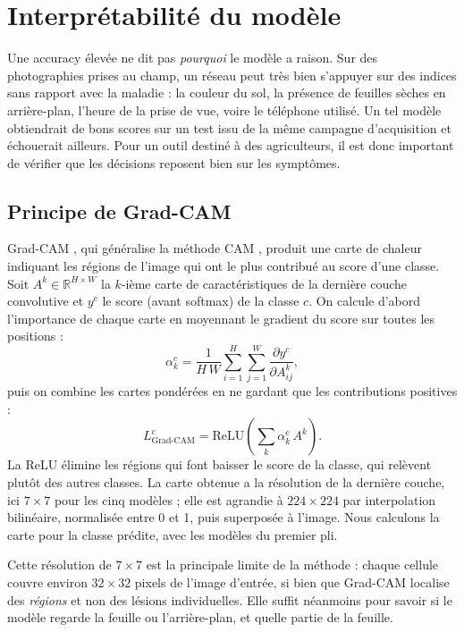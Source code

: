 \section{Interprétabilité du modèle}
\label{sec:interpretabilite}

Une accuracy élevée ne dit pas \emph{pourquoi} le modèle a raison. Sur des photographies prises au champ, un réseau peut très bien s'appuyer sur des indices sans rapport avec la maladie : la couleur du sol, la présence de feuilles sèches en arrière-plan, l'heure de la prise de vue, voire le téléphone utilisé. Un tel modèle obtiendrait de bons scores sur un test issu de la même campagne d'acquisition et échouerait ailleurs. Pour un outil destiné à des agriculteurs, il est donc important de vérifier que les décisions reposent bien sur les symptômes.

\subsection{Principe de Grad-CAM}

Grad-CAM \cite{selvaraju2017gradcam}, qui généralise la méthode CAM \cite{zhou2016learning}, produit une carte de chaleur indiquant les régions de l'image qui ont le plus contribué au score d'une classe. Soit $A^k \in \mathbb{R}^{H\times W}$ la $k$-ième carte de caractéristiques de la dernière couche convolutive et $y^c$ le score (avant softmax) de la classe $c$. On calcule d'abord l'importance de chaque carte en moyennant le gradient du score sur toutes les positions :
\begin{equation}
\alpha_k^c = \frac{1}{H\,W} \sum_{i=1}^{H}\sum_{j=1}^{W} \frac{\partial y^c}{\partial A^k_{ij}},
\label{eq:gradcam-weights}
\end{equation}
puis on combine les cartes pondérées en ne gardant que les contributions positives :
\begin{equation}
L^c_{\text{Grad-CAM}} = \mathrm{ReLU}\left( \sum_{k} \alpha_k^c\, A^k \right).
\label{eq:gradcam}
\end{equation}
La ReLU élimine les régions qui font baisser le score de la classe, qui relèvent plutôt des autres classes. La carte obtenue a la résolution de la dernière couche, ici $7\times7$ pour les cinq modèles ; elle est agrandie à $224\times224$ par interpolation bilinéaire, normalisée entre 0 et 1, puis superposée à l'image. Nous calculons la carte pour la classe prédite, avec les modèles du premier pli.

Cette résolution de $7\times7$ est la principale limite de la méthode : chaque cellule couvre environ $32\times32$ pixels de l'image d'entrée, si bien que Grad-CAM localise des \emph{régions} et non des lésions individuelles. Elle suffit néanmoins pour savoir si le modèle regarde la feuille ou l'arrière-plan, et quelle partie de la feuille.

